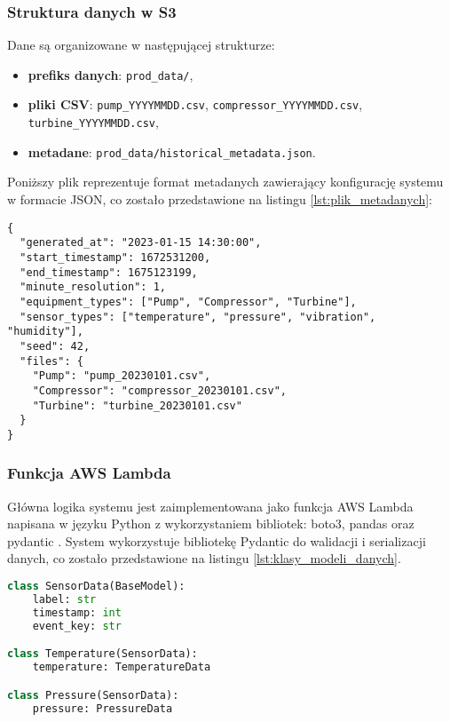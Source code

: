 \subsubsection{Struktura danych w S3}

Dane są organizowane w następującej strukturze:

\begin{itemize}
    \item \textbf{prefiks danych}: \texttt{prod\_data/},
    \item \textbf{pliki CSV}: \texttt{pump\_YYYYMMDD.csv}, \texttt{compressor\_YYYYMMDD.csv}, \texttt{turbine\_YYYYMMDD.csv},
    \item \textbf{metadane}: \texttt{prod\_data/historical\_metadata.json}.
\end{itemize}

Poniższy plik reprezentuje format metadanych zawierający konfigurację systemu w formacie JSON, co zostało przedstawione na listingu \ref{lst:plik_metadanych}:

\begin{lstlisting}[caption=Plik metadanych, label={lst:plik_metadanych}]
{
  "generated_at": "2023-01-15 14:30:00",
  "start_timestamp": 1672531200,
  "end_timestamp": 1675123199,
  "minute_resolution": 1,
  "equipment_types": ["Pump", "Compressor", "Turbine"],
  "sensor_types": ["temperature", "pressure", "vibration", "humidity"],
  "seed": 42,
  "files": {
    "Pump": "pump_20230101.csv",
    "Compressor": "compressor_20230101.csv", 
    "Turbine": "turbine_20230101.csv"
  }
}
\end{lstlisting}

\newpage

\subsubsection{Funkcja AWS Lambda}
\label{subsec:aws_lambda}

Główna logika systemu jest zaimplementowana jako funkcja AWS Lambda napisana w języku Python z wykorzystaniem bibliotek: boto3, pandas oraz pydantic \cite{pydantic_docs}. System wykorzystuje bibliotekę Pydantic do walidacji i serializacji danych, co zostało przedstawione na listingu \ref{lst:klasy_modeli_danych}.

\begin{lstlisting}[language=Python, caption=Klasy modeli danych, label={lst:klasy_modeli_danych}]
class SensorData(BaseModel):
    label: str
    timestamp: int
    event_key: str

class Temperature(SensorData):
    temperature: TemperatureData

class Pressure(SensorData):
    pressure: PressureData
\end{lstlisting}

